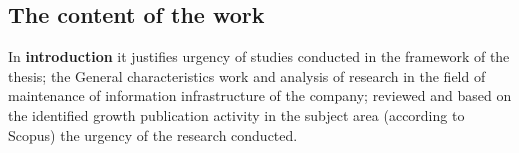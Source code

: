 \newcommand{\actuality}{\underline{\textbf{The relevance topic.}}}
\newcommand{\aim}{{\textbf{Goal}}}
\newcommand{\tasks}{{\textbf{tasks}}}
\newcommand{\scope}{{\textbf{Field of study}}}
\newcommand{\subject}{{\textbf{The subject of the study is}}}
\newcommand{\methods}{{\textbf{Research methods}}}
\newcommand{\defpositions}{{\textbf{The main provisions submitted for~defense:}}}
\newcommand{\novelty}{{\textbf{Scientific novelty}}}
\newcommand{\influence}{{\textbf{Practical significance.}}}
\newcommand{\reliability}{{\textbf{Reliability}}}
\newcommand{\probation}{{\textbf{Probe of the work.}}}
\newcommand{\contribution}{{\textbf{Personal contribution.}}}
\newcommand{\publications}{{\textbf{Publication.}}}





\subsection*{The content of the work}
In \textbf{introduction} it justifies urgency of studies conducted in the framework of the thesis; the General characteristics work and analysis of research in the field of maintenance of information infrastructure of the company; reviewed and based on the identified growth publication activity in the subject area (according to Scopus) the urgency of the research conducted. \par


